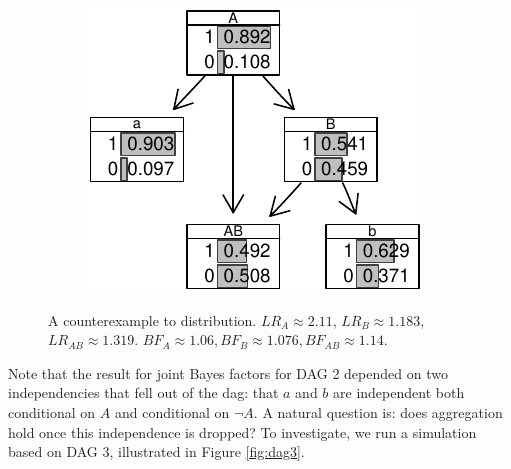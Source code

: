\documentclass[
  10pt,
  dvipsnames,enabledeprecatedfontcommands]{scrartcl}
\newcommand{\n}{\neg}
\begin{document}
\begin{figure}
\begin{subfigure}[!ht]{0.45\textwidth}
\vspace{2mm}

\normalsize
\end{subfigure} \begin{subfigure}[!ht]{0.45\textwidth}

\begin{center}\includegraphics[width=1\linewidth]{conjunction-appendix13_files/figure-latex/unnamed-chunk-25-1} \end{center}
\end{subfigure}
\caption{A counterexample to distribution. $LR_A  \approx 2.11$, $LR_B \approx 1.183$,  $LR_{AB} \approx 1.319$. \newline  $BF_A \approx  1.06, BF_B \approx    1.076, BF_{AB}\approx   1.14$.}
\label{tab:CPTconjunctionBNL}
\end{figure}

Note that the result for joint Bayes factors for \textsf{DAG 2} depended
on two independencies that fell out of the dag: that \(a\) and \(b\) are
independent both conditional on \(A\) and conditional on \(\n A\). A
natural question is: does aggregation hold once this independence is
dropped? To investigate, we run a simulation based on \textsf{DAG 3},
illustrated in Figure \ref{fig:dag3}.

\vspace{1mm}
\footnotesize

\normalsize
\end{document}
